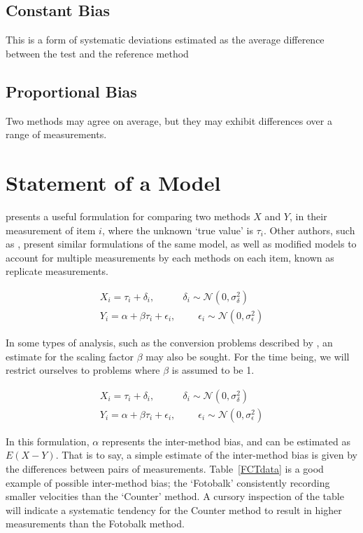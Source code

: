 \documentclass[12pt, a4paper]{report}
\theoremstyle{plain}
\theoremstyle{definition}
\theoremstyle{remark}
\begin{document}
	
	
	
	\subsection*{Constant Bias} This is a form of systematic
	deviations estimated as the average difference between the test
	and the reference method
	
	
	\subsection*{Proportional Bias} Two methods may agree on
	average, but they may exhibit differences over a range of
	measurements.
	
	


	\section{Statement of a Model}
	\citet{BXC2010} presents a useful formulation for comparing two methods $X$ and $Y$, in their measurement of item $i$, where the unknown `true value' is $\tau_i$. Other authors, such as \citet{kinsella}, present similar formulations of the same model, as well as modified models to account for multiple measurements by each methods on each item, known as replicate measurements.
	
	\begin{eqnarray} X_i = \tau_i + \delta_i , \phantom{spacin} \delta_i \sim \mathcal{N}(0,\sigma^2_\delta)\\ Y_i = \alpha + \beta \tau_i + \epsilon_i, \phantom{spaci}  \epsilon_i \sim \mathcal{N}(0,\sigma^2_\epsilon)\end{eqnarray}
	
	In some types of analysis, such as the conversion problems described by \citet{lewis}, an estimate for 
	the scaling factor $\beta$ may also be sought. For the time being, we will restrict ourselves to problems where $\beta$ is assumed to be 1. 
	
	\begin{eqnarray}
		X_i = \tau_i + \delta_i , \phantom{spacin} \delta_i \sim \mathcal{N}(0,\sigma^2_\delta)\\
		Y_i = \alpha + \beta \tau_i + \epsilon_i, \phantom{spaci}  \epsilon_i \sim \mathcal{N}(0,\sigma^2_\epsilon)
	\end{eqnarray}
	
	In this formulation, $\alpha$ represents the inter-method bias, and can be estimated as $E(X-Y)$. That is to say, a simple estimate of the inter-method bias is given by the differences between pairs of measurements.  Table~\ref{FCTdata} is a good example of possible inter-method bias; the `Fotobalk' consistently recording
	smaller velocities than the `Counter' method. A cursory inspection of the table will indicate a systematic tendency for the Counter method to result in higher measurements than the Fotobalk method. %
	
\end{document}
